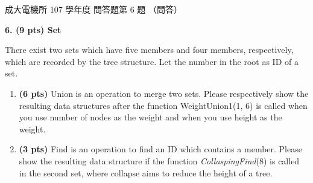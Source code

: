 \begin{pastexam}[label={px:ncku-107-ee-ds-10}]{成大電機所 107 學年度 問答題第 6 題}
（問答）

\textbf{6. (9 pts) Set}

There exist two sets which have five members and four members, respectively, which are recorded by the
tree structure. Let the number in the root as ID of a set.

\begin{center}
\end{center}
\begin{enumerate}[label=\alph*.]
\item \textbf{(6 pts)} Union is an operation to merge two sets. Please respectively show the resulting
data structures after the function WeightUnion1(1, 6) is called when you use number of nodes as the
weight and when you use height as the weight.
\item \textbf{(3 pts)} Find is an operation to find an ID which contains a member. Please show the
resulting data structure if the function \textit{CollaspingFind}(8) is called in the second set, where
collapse aims to reduce the height of a tree.
\end{enumerate}
\end{pastexam}

